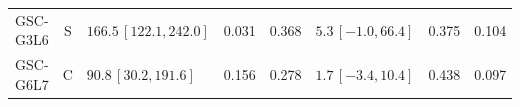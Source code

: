 \begin{longtable}{lcp{37mm}rrp{37mm}rr}
GSC-G3L6 & S & \(166.5\,[122.1,242.0]\) & 0.031 & 0.368 & \(5.3\,[-1.0,66.4]\) & 0.375 & 0.104\\
GSC-G6L7 & C & \(90.8\,[30.2,191.6]\) & 0.156 & 0.278 & \(1.7\,[-3.4,10.4]\) & 0.438 & 0.097\\

\end{longtable}

